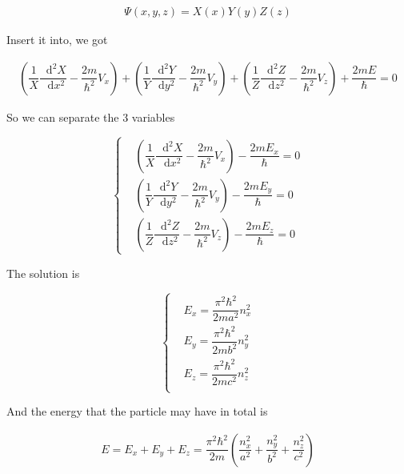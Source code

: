 \documentclass{article}
\newcommand*{\md}{\mathop{}\!\mathrm{d}}
\begin{document}
\begin{equation*}
  \begin{aligned}
    \Psi \left( x, y, z \right) = X \left( x \right) Y \left( y \right) Z \left( z \right)
  \end{aligned}
\end{equation*}

Insert it into, we got

\begin{equation*}
  \begin{aligned}
    \left( \dfrac{1}{X} \dfrac{\md^2 X}{\md x^2} - \dfrac{2 m}{\hbar^2} V_x \right) + \left( \dfrac{1}{Y} \dfrac{\md^2 Y}{\md y^2} - \dfrac{2 m}{\hbar^2} V_y \right) + \left( \dfrac{1}{Z} \dfrac{\md^2 Z}{\md z^2} - \dfrac{2 m}{\hbar^2} V_z \right) + \dfrac{2 m E}{\hbar} = 0
  \end{aligned}
\end{equation*}

So we can separate the 3 variables

\begin{equation*}
  \left\{
  \begin{aligned}
    & \left( \dfrac{1}{X} \dfrac{\md^2 X}{\md x^2} - \dfrac{2 m}{\hbar^2} V_x \right) - \dfrac{2 m E_x}{\hbar} = 0 \\
    & \left( \dfrac{1}{Y} \dfrac{\md^2 Y}{\md y^2} - \dfrac{2 m}{\hbar^2} V_y \right) - \dfrac{2 m E_y}{\hbar} = 0 \\
    & \left( \dfrac{1}{Z} \dfrac{\md^2 Z}{\md z^2} - \dfrac{2 m}{\hbar^2} V_z \right) - \dfrac{2 m E_z}{\hbar} = 0
  \end{aligned}
  \right.
\end{equation*}

The solution is

\begin{equation*}
  \left\{
  \begin{aligned}
    & E_x = \dfrac{\pi^2 \hbar^2}{2 m a^2} n_x^2 \\ 
    & E_y = \dfrac{\pi^2 \hbar^2}{2 m b^2} n_y^2 \\ 
    & E_z = \dfrac{\pi^2 \hbar^2}{2 m c^2} n_z^2 \\ 
  \end{aligned}
  \right.
\end{equation*}

And the energy that the particle may have in total is

\begin{equation*}
  \begin{aligned}
    E = E_x + E_y + E_z = \dfrac{\pi^2 \hbar^2}{2 m} \left( \dfrac{n_x^2}{a^2} + \dfrac{n_y^2}{b^2} + \dfrac{n_z^2}{c^2} \right)
  \end{aligned}
\end{equation*}
\end{document}
